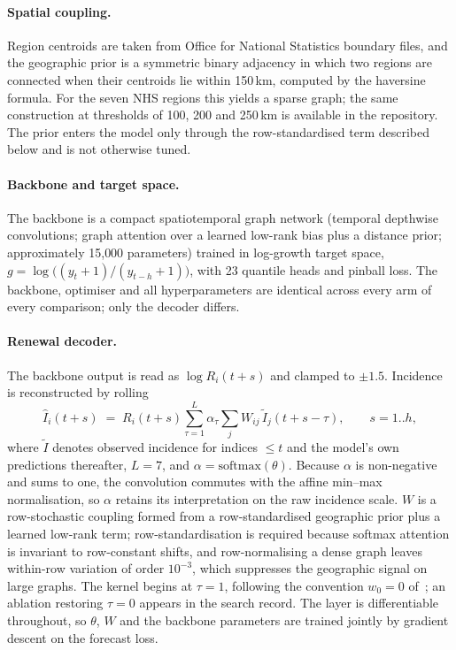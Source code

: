\documentclass[10pt,letterpaper]{article}
\begin{document}
\paragraph{Spatial coupling.} Region centroids are taken from Office for
National Statistics boundary files, and the geographic prior is a symmetric
binary adjacency in which two regions are connected when their centroids lie
within 150\,km, computed by the haversine formula. For the seven NHS regions
this yields a sparse graph; the same construction at thresholds of 100, 200 and
250\,km is available in the repository. The prior enters the model only through
the row-standardised term described below and is not otherwise tuned.

\paragraph{Backbone and target space.} The backbone is a compact
spatiotemporal graph network (temporal depthwise convolutions; graph
attention over a learned low-rank bias plus a distance prior; approximately
15{,}000 parameters) trained in log-growth target space,
$g=\log\big((y_{t}+1)/(y_{t-h}+1)\big)$, with 23 quantile heads and pinball
loss. The backbone, optimiser and all hyperparameters are identical across
every arm of every comparison; only the decoder differs.

\paragraph{Renewal decoder.} The backbone output is read as $\log R_i(t+s)$
and clamped to $\pm1.5$. Incidence is reconstructed by rolling
\begin{equation}
  \hat I_i(t+s) \;=\; R_i(t+s) \sum_{\tau=1}^{L} \alpha_\tau
  \sum_j W_{ij}\, \tilde I_j(t+s-\tau), \qquad s=1..h,
\end{equation}
where $\tilde I$ denotes observed incidence for indices $\leq t$ and the
model's own predictions thereafter, $L=7$, and
$\alpha=\mathrm{softmax}(\theta)$. Because $\alpha$ is non-negative and sums
to one, the convolution commutes with the affine min--max normalisation, so
$\alpha$ retains its interpretation on the raw incidence scale. $W$ is a
row-stochastic coupling formed from a row-standardised geographic prior plus
a learned low-rank term; row-standardisation is required because softmax
attention is invariant to row-constant shifts, and row-normalising a dense
graph leaves within-row variation of order $10^{-3}$, which suppresses the
geographic signal on large graphs. The kernel begins at $\tau=1$, following
the convention $w_0=0$ of~\cite{cori2013new}; an ablation restoring $\tau=0$
appears in the search record. The layer is differentiable throughout, so
$\theta$, $W$ and the backbone parameters are trained jointly by gradient
descent on the forecast loss.
\end{document}
